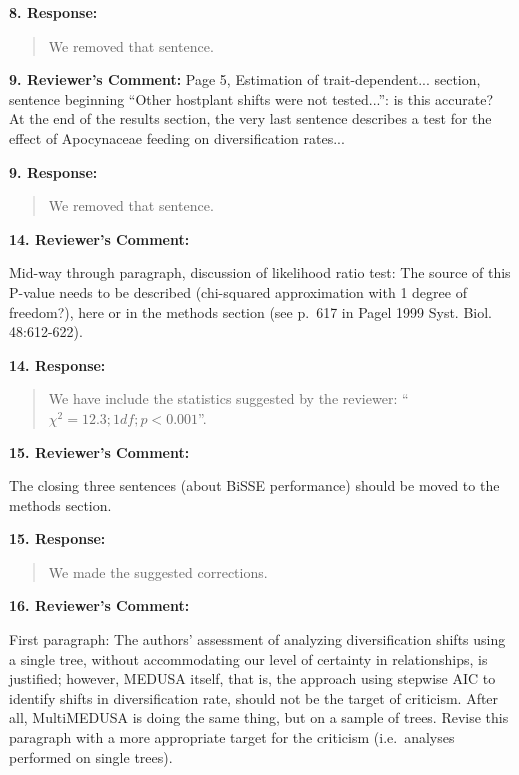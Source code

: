 \documentclass[]{article}
\begin{document}
 \textbf{8. Response:}

\begin{quote}
\color{blue}
We removed that sentence.
\end{quote}

\textbf{9. Reviewer's Comment:}
Page 5, Estimation of trait-dependent... section, sentence beginning “Other hostplant shifts were not tested...”: is this accurate? At the end of the results section, the very last sentence describes a test for the effect of Apocynaceae feeding on diversification rates...

\textbf{9. Response:}

\begin{quote}
\color{blue}
We removed that sentence.
\end{quote}

\textbf{14. Reviewer's Comment:}

Mid-way through paragraph, discussion of likelihood ratio test: The
source of this P-value needs to be described (chi-squared approximation
with 1 degree of freedom?), here or in the methods section (see p.~617
in Pagel 1999 Syst. Biol. 48:612-622).

\textbf{14. Response:}

\begin{quote}
\color{blue}
We have include the statistics suggested by the reviewer:
``\textbf{\(\chi^2 = 12.3; 1 df; p < 0.001\)}''.
\end{quote}

\textbf{15. Reviewer's Comment:}

The closing three sentences (about BiSSE performance) should be moved to
the methods section.

\textbf{15. Response:}

\begin{quote}
\color{blue}
We made the suggested corrections.
\end{quote}

\textbf{16. Reviewer's Comment:}

First paragraph: The authors' assessment of analyzing diversification
shifts using a single tree, without accommodating our level of certainty
in relationships, is justified; however, MEDUSA itself, that is, the
approach using stepwise AIC to identify shifts in diversification rate,
should not be the target of criticism. After all, MultiMEDUSA is doing
the same thing, but on a sample of trees. Revise this paragraph with a
more appropriate target for the criticism (i.e.~analyses performed on
single trees).
\end{document}
